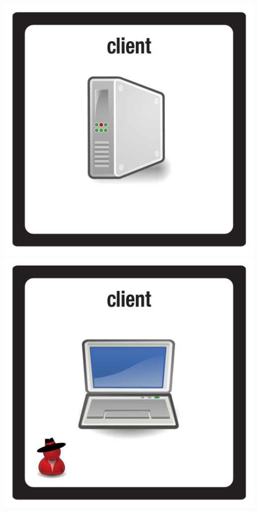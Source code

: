 \documentclass{letter}
\begin{document}
\includegraphics{tiles/node_client_tower}
\includegraphics{tiles/node_client_laptop} \\
\end{document}
